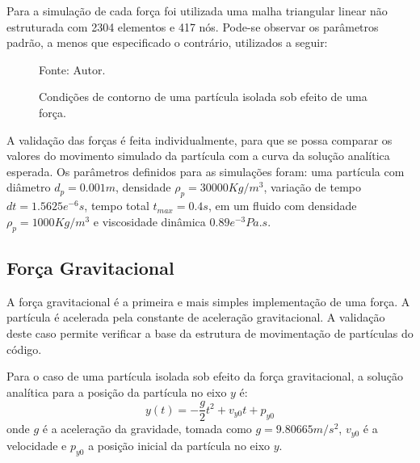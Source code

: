 Para a simulação de cada força foi utilizada uma malha triangular linear não estruturada com 2304 elementos e 417 nós.
Pode-se observar os parâmetros padrão, a menos que especificado o contrário, utilizados a seguir:
\begin{figure}[H]
    \centering
     {\raggedleft \scriptsize Fonte: Autor.}
    \caption{Condições de contorno de uma partícula isolada sob efeito de uma força.}
    \label{force_bc}
\end{figure}
A validação das forças é feita individualmente, para que se possa comparar os valores do movimento simulado da partícula com a curva da solução analítica esperada.
Os parâmetros definidos para as simulações foram: uma partícula com diâmetro $d_p=0.001m$, densidade $\rho_p=30000Kg/m^3$, variação de tempo $dt=1.5625e^{-6}s$, tempo total $t_{max}=0.4s$, em um fluido com densidade $\rho_p=1000Kg/m^3$ e viscosidade dinâmica $0.89e^{-3}Pa.s$.

\subsection{\textbf{Força Gravitacional}}
\label{sec_grav}
A força gravitacional é a primeira e mais simples implementação de uma força.
A partícula é acelerada pela constante de aceleração gravitacional.
A validação deste caso permite verificar a base da estrutura de movimentação de partículas do código.

Para o caso de uma partícula isolada sob efeito da força gravitacional, a solução analítica para a posição da partícula no eixo $y$ é:
\begin{equation}
    y(t) = -\dfrac{g}{2}t^2 + v_{y0}t + p_{y0}
    \label{grav_sol} 
\end{equation}
onde $g$ é a aceleração da gravidade, tomada como $g=9.80665m/s^2$, $v_{y0}$ é a velocidade e $p_{y0}$ a posição inicial da partícula no eixo $y$.

